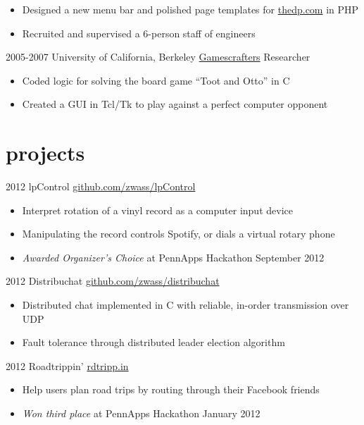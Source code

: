 \documentclass[]{wasserman-cv}
\begin{document}
\begin{entrylist}
{\begin{itemize}
      pageviews)
    \item Designed a new menu bar and polished page templates for
      \href{http://www.thedp.com}{thedp.com} in PHP
    \item Recruited and supervised a 6-person staff of engineers
    \end{itemize}
  }
  \entry
  {2005-2007}
  {University of California, Berkeley}
  {\href{http://gamescrafters.berkeley.edu/}{Gamescrafters} Researcher}
  {\begin{itemize}
    \item Coded logic for solving the board game ``Toot and Otto'' in C
    \item Created a GUI in Tcl/Tk to play against
      a perfect computer opponent
    \end{itemize}}
\end{entrylist}

\section{projects}

\begin{entrylist}
  \entry
  {2012}
  {lpControl}
  {\href{https://github.com/zwass/lpControl}{github.com/zwass/lpControl}}
  {\begin{itemize}
    \item Interpret rotation of a vinyl record as a computer input device
    \item Manipulating the record controls Spotify, or dials a virtual rotary phone
    \item \emph{Awarded Organizer's Choice} at PennApps Hackathon September
      2012
    \end{itemize}}
  \entry
  {2012}
  {Distribuchat}
  {\href{https://github.com/zwass/distribuchat}{github.com/zwass/distribuchat}}
  {\begin{itemize}
    \item Distributed chat implemented in C with
      reliable, in-order transmission over UDP
    \item Fault tolerance through distributed leader election algorithm
    \end{itemize}}
  \entry
  {2012}
  {Roadtrippin'}
  {\href{http://rdtripp.in}{rdtripp.in}}
  {\begin{itemize}
    \item Help users plan road trips by routing through their Facebook friends
    \item \emph{Won third place} at PennApps Hackathon January 2012
    \end{itemize}}
\end{entrylist}
\end{document}
